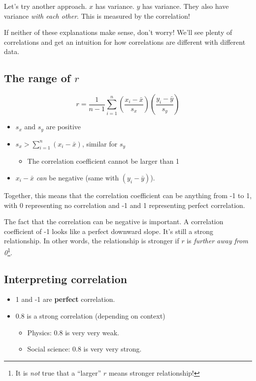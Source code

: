 \documentclass[
  letterpaper,
  DIV=11,
  numbers=noendperiod,
  oneside]{scrreprt}
\providecommand{\tightlist}{%
  \setlength{\itemsep}{0pt}\setlength{\parskip}{0pt}}\usepackage{longtable,booktabs,array}
\begin{document}
Let's try another approach. \(x\) has variance. \(y\) has variance. They
also have variance \emph{with each other}. This is measured by the
correlation!

If neither of these explanations make sense, don't worry! We'll see
plenty of correlations and get an intuition for how correlations are
different with different data.

\hypertarget{the-range-of-r}{%
\subsection{\texorpdfstring{The range of
\(r\)}{The range of r}}\label{the-range-of-r}}

\[
r = \frac{1}{n-1}\sum_{i=1}^n\left(\frac{x_i - \bar x}{s_x}\right)\left(\frac{y_i - \bar y}{s_y}\right)
\]

\begin{itemize}
\tightlist
\item
  \(s_x\) and \(s_y\) are positive
\item
  \(s_x > \sum_{i=1}^n(x_i - \bar x)\), similar for \(s_y\)

  \begin{itemize}
  \tightlist
  \item
    The correlation coefficient cannot be larger than 1
  \end{itemize}
\item
  \(x_i - \bar x\) \emph{can} be negative (same with \((y_i-\bar y)\)).
\end{itemize}

Together, this means that the correlation coefficient can be anything
from -1 to 1, with 0 representing no correlation and -1 and 1
representing perfect correlation.

The fact that the correlation can be negative is important. A
correlation coefficient of -1 looks like a perfect downward slope. It's
still a strong relationship. In other words, the relationship is
stronger if \(r\) is \emph{further away from 0}\footnote{It is
  \emph{not} true that a ``larger'' \(r\) means stronger relationship!}.

\hypertarget{interpreting-correlation}{%
\subsection{Interpreting correlation}\label{interpreting-correlation}}

\begin{itemize}
\tightlist
\item
  1 and -1 are \textbf{perfect} correlation.
\item
  0.8 is a strong correlation (depending on context)

  \begin{itemize}
  \tightlist
  \item
    Physics: 0.8 is very very weak.
  \item
    Social science: 0.8 is very very strong.
  \end{itemize}
\end{itemize}
\end{document}

